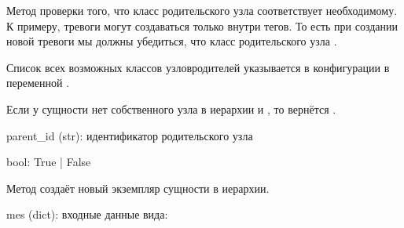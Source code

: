 \documentclass[a4paper,10pt,russian]{sphinxmanual}
\begin{document}
\begin{fulllineitems}
\begin{fulllineitems}

\pysigstartsignatures
{}
\pysigstopsignatures
\sphinxAtStartPar
Метод проверки того, что класс родительского узла
соответствует необходимому. К примеру, тревоги могут создаваться только
внутри тегов. То есть при создании новой тревоги мы должны убедиться,
что класс родительского узла \sphinxhyphen{} .

\sphinxAtStartPar
Список всех возможных классов узлов\sphinxhyphen{}родителей указывается
в конфигурации в переменной .

\sphinxAtStartPar
Если у сущности нет собственного узла в иерархии и
, то вернётся .
\begin{description}
\sphinxAtStartPar
parent\_id (str): идентификатор родительского узла

\sphinxAtStartPar
bool: True | False

\end{description}

\end{fulllineitems}



\begin{fulllineitems}

\pysigstartsignatures
{}
\pysigstopsignatures
\sphinxAtStartPar
Метод создаёт новый экземпляр сущности в иерархии.
\begin{description}
\sphinxAtStartPar
mes (dict): входные данные вида:
\begin{quote}

\begin{sphinxVerbatim}[commandchars=\\\{\}]
\end{sphinxVerbatim}


\end{quote}
\end{description}
\end{fulllineitems}
\end{fulllineitems}
\end{document}
